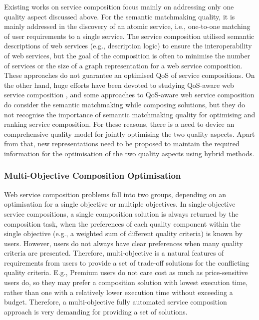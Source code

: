 Existing works on service composition focus mainly on addressing only one quality aspect discussed above. For the semantic matchmaking quality, it is mainly addressed in the discovery of an atomic service, i.e., one-to-one matching of user requirements to a single service. The service composition \cite{bansal2016generalized,boustil2014semantic,mier2015integrated} utilised semantic descriptions of web services (e.g., description logic) to ensure the interoperability of web services, but the goal of the composition is often to minimise the number of services or the size of a graph representation for a web service composition. These approaches do not guarantee an optimised QoS of service compositions. On the other hand, huge efforts have been devoted to studying QoS-aware web service composition \cite{gupta2015optimization,ma2015hybrid,qi2010combining,da2016particle,da2015graphevol,yu2013adaptive}, and some approaches to QoS-aware web service composition do consider the semantic matchmaking while composing solutions, but they do not recognise the importance of semantic matchmaking quality for optimising and ranking service composition. For these reasons, there is a need to device an comprehensive quality model for jointly optimising the two quality aspects. Apart from that, new representations need to be proposed to maintain the required information for the optimisation of the two quality aspects using hybrid methods.


\subsubsection{Multi-Objective Composition Optimisation}
Web service composition problems fall into two groups, depending on an optimisation for a single objective or multiple objectives. In single-objective service compositions, a single composition solution is always returned by the composition task, when the preferences of each quality component within the single objective (e.g., a weighted sum of different quality criteria) is known by users. However, users do not always have clear preferences when many quality criteria are presented. Therefore, multi-objective is a natural features of requirements from users to provide a set of trade-off solutions for the conflicting quality criteria. E.g., Premium users do not care cost as much as price-sensitive users do, so they may prefer a composition solution with lowest execution time,  rather than one with a relatively lower execution time without exceeding a budget. Therefore, a multi-objective  fully automated service composition approach is very demanding for providing a set of solutions.

